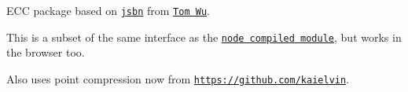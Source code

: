 E\+CC package based on \href{https://github.com/andyperlitch/jsbn}{\tt jsbn} from \href{http://www-cs-students.stanford.edu/~tjw/}{\tt Tom Wu}.

This is a subset of the same interface as the \href{https://github.com/quartzjer/ecc}{\tt node compiled module}, but works in the browser too.

Also uses point compression now from \href{https://github.com/kaielvin/jsbn-ec-point-compression}{\tt https\+://github.\+com/kaielvin}. 